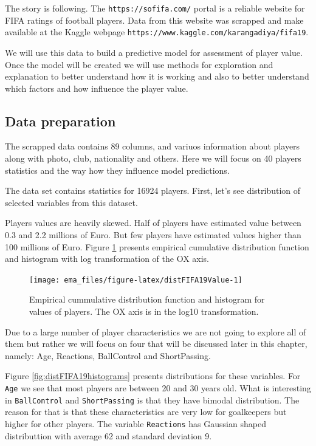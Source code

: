 \documentclass[12pt,]{krantz}
\begin{document}
The story is following. The \texttt{https://sofifa.com/} portal is a reliable website for FIFA ratings of football players. Data from this website was scrapped and make available at the Kaggle webpage \texttt{https://www.kaggle.com/karangadiya/fifa19}.

We will use this data to build a predictive model for assessment of player value. Once the model will be created we will use methods for exploration and explanation to better understand how it is working and also to better understand which factors and how influence the player value.

\hypertarget{data-preparation}{%
\subsection{Data preparation}\label{data-preparation}}

The scrapped data contains 89 columns, and variuos information about players along with photo, club, nationality and others.
Here we will focus on 40 players statistics and the way how they influence model predictions.

The data set contains statistics for 16924 players. First, let's see distribution of selected variables from this dataset.

Players values are heavily skewed. Half of players have estimated value between 0.3 and 2.2 millions of Euro. But few players have estimated values higher than 100 millions of Euro. Figure \ref{fig:distFIFA19Value} presents empirical cumulative distribution function and histogram with log transformation of the OX axis.

\begin{figure}

{\centering \texttt{[image: ema\_files/figure-latex/distFIFA19Value-1]} 

}

\caption{Empirical cummulative distribution function and histogram for values of players. The OX axis is in the log10 transformation.}\label{fig:distFIFA19Value}
\end{figure}

Due to a large number of player characteristics we are not going to explore all of them but rather we will focus on four that will be discussed later in this chapter, namely: Age, Reactions, BallControl and ShortPassing.

Figure \ref{fig:distFIFA19histograms} presents distributions for these variables. For \texttt{Age} we see that most players are between 20 and 30 years old. What is interesting in \texttt{BallControl} and \texttt{ShortPassing} is that they have bimodal distribution. The reason for that is that these characteristics are very low for goalkeepers but higher for other players. The variable \texttt{Reactions} has Gaussian shaped distributtion with average 62 and standard deviation 9.
\end{document}

